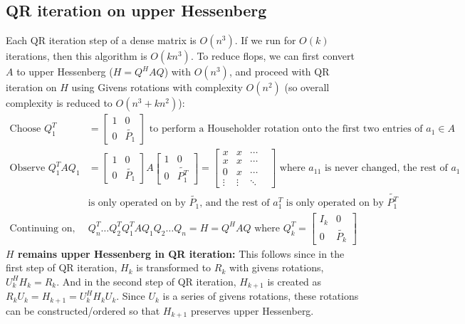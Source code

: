 \documentclass{article}
\begin{document}
\subsection{QR iteration on upper Hessenberg}
Each QR iteration step of a dense matrix is $O(n^3)$. If we run for $O(k)$ iterations, then this algorithm is $O(kn^3)$. To reduce flops, we can first convert $A$ to upper Hessenberg ($H = Q^HAQ$) with $O(n^3)$, and proceed with QR iteration on $H$ using Givens rotations with complexity $O(n^2)$ (so overall complexity is reduced to $O(n^3 + kn^2)$):
\begin{align*}
    \textrm{Choose } Q_1^T &= \begin{bmatrix} 1 & 0 \\ 0 & \tilde{P_1} \end{bmatrix} \textrm{ to perform a Householder rotation onto the first two entries of } a_1 \in A\\
    \textrm{Observe }Q_1^T A Q_1 &= \begin{bmatrix} 1 & 0 \\ 0 & \tilde{P_1} \end{bmatrix} A \begin{bmatrix} 1 & 0 \\ 0 & \tilde{P_1^T} \end{bmatrix} = \begin{bmatrix} x & x & \cdots & \\
        x & x & \cdots \\ 0 & x &\cdots \\ \vdots & \vdots & \ddots \end{bmatrix} \textrm{ where $a_{11}$ is never changed, the rest of $a_1$}\\
        &\textrm{is only operated on by $\tilde{P_1}$, and the rest of $a_1^T$ is only operated on by $\tilde{P_1^T}$}\\
    \textrm{Continuing on, } & Q_n^T \dots Q_2^TQ_1^T A Q_1Q_2 \dots Q_n = H = Q^HAQ \textrm{ where } Q_k^T = \begin{bmatrix} I_k & 0 \\ 0 & \tilde{P_k} \end{bmatrix}
\end{align*}
\textbf{$H$ remains upper Hessenberg in QR iteration:} This follows since in the first step of QR iteration, $H_k$ is transformed to $R_k$ with givens rotations, $U_k^HH_k = R_k$. And in the second step of QR iteration, $H_{k+1}$ is created as $R_kU_k = H_{k+1} = U_k^HH_kU_k$. Since $U_k$ is a series of givens rotations, these rotations can be constructed/ordered so that $H_{k+1}$ preserves upper Hessenberg.
\end{document}
